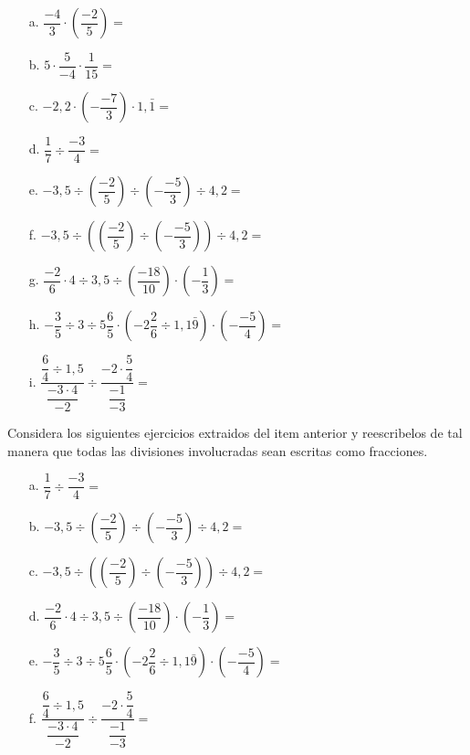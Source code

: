 \documentclass[spanish,letterpaper, 11pt, addpoints, answers]{exam}
\begin{document}
\begin{questions}
\begin{itemize}
\item[a.] $\dfrac{-4}{3}\cdot \left(\dfrac{-2}{5}\right)=$
\vspace{3cm}
\item[b.] $5\cdot \dfrac{5}{-4}\cdot \dfrac{1}{15}=$
\vspace{3cm}
\item[c.] $-2{,}2\cdot \left(-\dfrac{-7}{3}\right)\cdot 1{,}\bar{1}=$
\vspace{3cm}
\item[d.] $\dfrac{1}{7}\div \dfrac{-3}{4}=$
\vspace{3cm}
\item[e.] $-3{,}5\div \left(\dfrac{-2}{5}\right)\div \left(-\dfrac{-5}{3}\right)\div 4{,}2=$
\vspace{3cm}
\item[f.] $-3{,}5\div \left(\left(\dfrac{-2}{5}\right)\div \left(-\dfrac{-5}{3}\right)\right)\div 4{,}2=$
\vspace{3cm}
\item[g.] $\dfrac{-2}{6}\cdot 4\div 3{,}5\div \left(\dfrac{-18}{10}\right)\cdot \left(-\dfrac{1}{3}\right)=$
\vspace{3cm}
\item[h.] $-\dfrac{3}{5}\div 3\div 5\dfrac{6}{5}\cdot \left(-2\dfrac{2}{6}\div1{,}1\bar{9}\right)\cdot \left(-\dfrac{-5}{4}\right)=$
\vspace{3cm}
\item[i.] $\dfrac{\dfrac{6}{4}\div 1{,}5}{\dfrac{-3\cdot 4}{-2}}\div\dfrac{-2\cdot \dfrac{5}{4}}{\dfrac{-1}{-3}}=$
\vspace{3cm}
\end{itemize}


\question Considera los siguientes ejercicios extraidos del item anterior y reescribelos de tal manera que todas las divisiones involucradas sean escritas como fracciones.

\begin{itemize}
  \item[a.] $\dfrac{1}{7}\div \dfrac{-3}{4}=$
  \vspace{3cm}
  \item[b.] $-3{,}5\div \left(\dfrac{-2}{5}\right)\div \left(-\dfrac{-5}{3}\right)\div 4{,}2=$
  \vspace{3cm}
  \item[c.] $-3{,}5\div \left(\left(\dfrac{-2}{5}\right)\div \left(-\dfrac{-5}{3}\right)\right)\div 4{,}2=$
  \vspace{3cm}
  \item[d.] $\dfrac{-2}{6}\cdot 4\div 3{,}5\div \left(\dfrac{-18}{10}\right)\cdot \left(-\dfrac{1}{3}\right)=$
  \vspace{3cm}
  \item[e.] $-\dfrac{3}{5}\div 3\div 5\dfrac{6}{5}\cdot \left(-2\dfrac{2}{6}\div1{,}1\bar{9}\right)\cdot \left(-\dfrac{-5}{4}\right)=$
  \vspace{3cm}
  \item[f.] $\dfrac{\dfrac{6}{4}\div 1{,}5}{\dfrac{-3\cdot 4}{-2}}\div\dfrac{-2\cdot \dfrac{5}{4}}{\dfrac{-1}{-3}}=$
  \vspace{3cm}
\end{itemize}


\end{questions}
\end{document}
